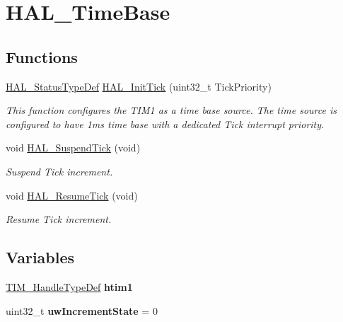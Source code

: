 \hypertarget{group___h_a_l___time_base}{}\section{H\+A\+L\+\_\+\+Time\+Base}
\label{group___h_a_l___time_base}
\subsection*{Functions}
\begin{DoxyCompactItemize}
\item 
\mbox{\hyperlink{stm32f4xx__hal__def_8h_a63c0679d1cb8b8c684fbb0632743478f}{H\+A\+L\+\_\+\+Status\+Type\+Def}} \mbox{\hyperlink{group___h_a_l___time_base_ga879cdb21ef051eb81ec51c18147397d5}{H\+A\+L\+\_\+\+Init\+Tick}} (uint32\+\_\+t Tick\+Priority)
\begin{DoxyCompactList}\small\item\em This function configures the T\+I\+M1 as a time base source. The time source is configured to have 1ms time base with a dedicated Tick interrupt priority. \end{DoxyCompactList}\item 
void \mbox{\hyperlink{group___h_a_l___time_base_gaaf651af2afe688a991c657f64f8fa5f9}{H\+A\+L\+\_\+\+Suspend\+Tick}} (void)
\begin{DoxyCompactList}\small\item\em Suspend Tick increment. \end{DoxyCompactList}\item 
void \mbox{\hyperlink{group___h_a_l___time_base_ga24e0ee9dae1ec0f9d19200f5575ff790}{H\+A\+L\+\_\+\+Resume\+Tick}} (void)
\begin{DoxyCompactList}\small\item\em Resume Tick increment. \end{DoxyCompactList}\end{DoxyCompactItemize}
\subsection*{Variables}
\begin{DoxyCompactItemize}
\item 
\mbox{\label{group___h_a_l___time_base_ga25fc663547539bc49fecc0011bd76ab5}} 
\mbox{\hyperlink{struct_t_i_m___handle_type_def}{T\+I\+M\+\_\+\+Handle\+Type\+Def}} {\bfseries htim1}
\item 
\mbox{\label{group___h_a_l___time_base_gad252e5fa14fe03797c816cfb14962693}} 
uint32\+\_\+t {\bfseries uw\+Increment\+State} = 0
\end{DoxyCompactItemize}


